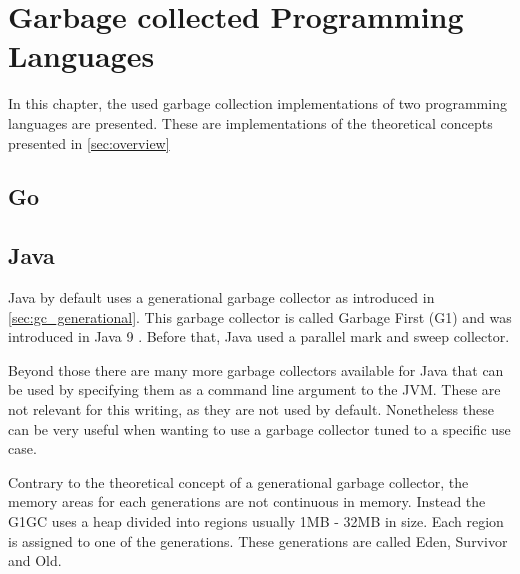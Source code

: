 \chapter{Garbage collected Programming Languages}

In this chapter, the used garbage collection implementations of two programming
languages are presented. These are implementations of the theoretical concepts
presented in \autoref{sec:overview}

\section{Go}
\section{Java}

Java by default uses a generational garbage collector as introduced in \autoref{sec:gc_generational}.
This garbage collector is called Garbage First (G1) and was introduced in Java 9 \cite{java_gc_comparison_2018}.
Before that, Java used a parallel mark and sweep collector.

Beyond those there are many more garbage collectors available for Java that can
be used by specifying them as a command line argument to the JVM.
These are not relevant for this writing, as they are not used by default.
Nonetheless these can be very useful when wanting to use a garbage collector
tuned to a specific use case.

Contrary to the theoretical concept of a generational garbage collector,
the memory areas for each generations are not continuous in memory.
Instead the G1GC uses a heap divided into regions usually 1MB - 32MB in size.
Each region is assigned to one of the generations.
These generations are called Eden, Survivor and Old. \cite{java_g1_getting_started}

